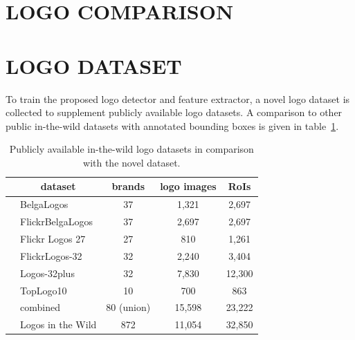 \documentclass[a4paper,twoside]{article}
\newcommand{\vertboxs}[1]{\rotatebox{90}{\parbox{14mm}{\centering #1}}}
\newcommand{\vertboxt}[1]{\rotatebox{90}{\parbox{10mm}{\centering #1}}}
\begin{document}

\section{\uppercase{Logo Comparison}}


\section{\uppercase{Logo Dataset}}
\noindent To train the proposed logo detector and feature extractor, a novel logo dataset is collected to supplement publicly available logo datasets. A comparison to other public in-the-wild datasets with annotated bounding boxes is given in table~\ref{tab:logoDatasets}.
%
\begin{table}[t]
\centering
\caption{Publicly available in-the-wild logo datasets in comparison with the novel dataset.}
\label{tab:logoDatasets}
\begin{small}
\begin{tabular}{cl|ccc}
& \multicolumn{1}{c|}{\textbf{dataset}} & \textbf{brands} & \textbf{logo images} & \textbf{RoIs} \bigstrut[b]\\
\hline
\multirow{8}{*}{\vertboxs{public}} & BelgaLogos \cite{joly2009,letessier2012} & 37 & 1,321 & 2,697 \bigstrut[t] \\
& FlickrBelgaLogos \cite{letessier2012} & 37 & 2,697 & 2,697 \\
& Flickr Logos 27 \cite{kalantidis2011} & 27 & 810 & 1,261 \\
& FlickrLogos-32 \cite{romberg2011} & 32 & 2,240 & 3,404 \\
& Logos-32plus \cite{bianco2015,bianco2017} & 32 & 7,830 & 12,300 \\
& TopLogo10 \cite{su2016} & 10 & 700 & 863 \bigstrut[b] \\
\cline{2-5}
& combined & 80 (union) & 15,598 & 23,222 \bigstrut \\
\hline
\begin{minipage}[c]{0.1cm}\vertboxt{new}\end{minipage} & Logos in the Wild & 872 & 11,054 & 32,850 \bigstrut[t]
\end{tabular}
\end{small}
\end{table}
\end{document}
